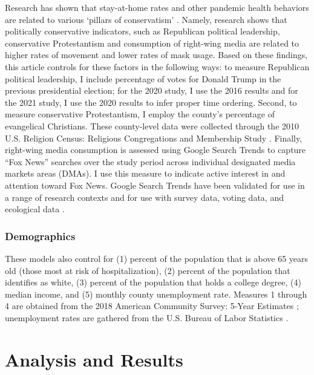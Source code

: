 Research has shown that stay-at-home rates and other pandemic health behaviors
are related to various `pillars of conservatism' \citep{gonzalez_etal21,hillBloodChristCompels2020,hillLoveThyAged2021, hillNastiestQuestion}. Namely, research shows that politically conservative
indicators, such as Republican political leadership, conservative Protestantism
and consumption of right-wing media are related to higher rates of movement and
lower rates of mask usage. Based on these findings, this article controls for
these factors in the following ways: to measure Republican political leadership,
I include percentage of votes for Donald Trump in the previous presidential
election; for the 2020 study, I use the 2016 results and for the 2021 study, I
use the 2020 results to infer proper time ordering. Second, to measure
conservative Protestantism, I employ the county's percentage of evangelical
Christians. These county-level data were collected through the 2010 U.S.
Religion Census: Religious Congregations and Membership Study \citep{grammich_etal18}. Finally, right-wing media consumption is assessed using
Google Search Trends to capture ``Fox News'' searches over the study period across
individual designated media markets areas (DMAs). I use this measure to indicate
active interest in and attention toward Fox News. Google Search Trends have been
validated for use in a range of research contexts and for use with survey data,
voting data, and ecological data \citep{bailPrestigeProximityPrejudice2019, reyesUsingInternetSearch2018, scheitleGoogleInsightsSearch2011, stephensdavidowitzCostRacialAnimus2014, swearingenGoogleInsightsSenate2014}.

\hypertarget{demographics}{%
\subsubsection{Demographics}\label{demographics}}

These models also control for (1) percent of the population that is above 65
years old (those most at risk of hospitalization), (2) percent of the population
that identifies as white, (3) percent of the population that holds a college
degree, (4) median income, and (5) monthly county unemployment rate. Measures 1
through 4 are obtained from the 2018 American Community Survey: 5-Year Estimates \citep{uscensusbureauAmericanCommunitySurvey2018}; unemployment rates are gathered
from the U.S. Bureau of Labor Statistics \citep{labor2020a}.

\hypertarget{analysis-and-results}{%
\section{Analysis and Results}\label{analysis-and-results}}

